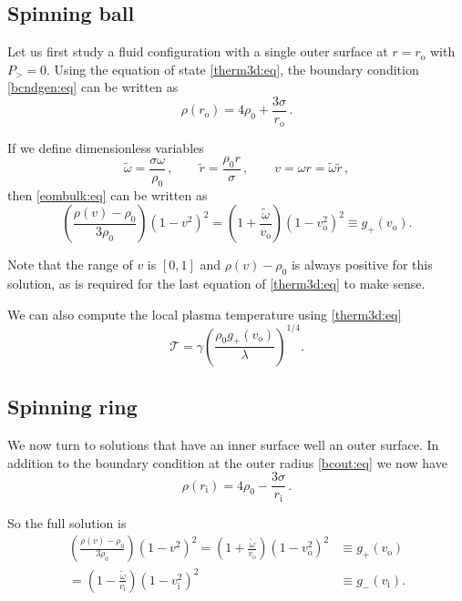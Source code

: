 \documentclass[12pt,a4paper]{article}
\newcommand{\prn}[1]{\left ( #1 \right )}
\newcommand{\rz}{\rho_0}
\newcommand{\tloc}{\mathcal{T}}
\newcommand{\ri}{r_\mathrm{i}}
\newcommand{\ro}{r_\mathrm{o}}
\newcommand{\vi}{v_\mathrm{i}}
\newcommand{\vo}{v_\mathrm{o}}
\newcommand{\z}{\tilde{r}}
\newcommand{\tw}{\widetilde{\omega}}
\begin{document}
\subsection{Spinning ball}\label{sec:ballsol}

Let us first study a fluid configuration with a single outer surface
at $r=\ro$ with $P_>=0$. Using the equation of state
\eqref{therm3d:eq}, the boundary condition \eqref{bcndgen:eq} can be
written as
%
\begin{equation}\label{bcout:eq}
  \rho(\ro) = 4\rz + \frac{3\sigma}{\ro}\,.
\end{equation}
%

If we define dimensionless variables
%
\begin{equation}\label{newvars:eq}
    \tw = \frac{\sigma\omega}{\rz} \,,   \qquad
    \z = \frac{\rz r}{\sigma} \,,   \qquad
    v = \omega r = \tw \z \,,
\end{equation}
%
then \eqref{eombulk:eq} can be written as
%
\begin{equation}\label{ballsol:eq}
  \prn{\frac{\rho(v)-\rz}{3\rz}}\prn{1-v^2}^{2}
       = \prn{1+\frac{\tw}{\vo}}\prn{1-\vo^2}^{2}
       \equiv g_+(\vo).
\end{equation}
%

Note that the range of $v$ is $[0,1]$ and $\rho(v)-\rz$ is always
positive for this solution, as is required for the last equation of
\eqref{therm3d:eq} to make sense.

We can also compute the local plasma temperature using
\eqref{therm3d:eq}
%
\begin{equation}\label{temploc:eq}
  \tloc = \gamma\prn{\frac{\rz g_+(\vo)}{\lambda}}^{1/4}.
\end{equation}
%

\subsection{Spinning ring}\label{sec:ringsol}

We now turn to solutions that have an inner surface well an outer
surface. In addition to the boundary condition at the outer radius
\eqref{bcout:eq} we now have
%
\begin{equation}\label{bcin:eq}
  \rho(\ri) = 4\rz - \frac{3\sigma}{\ri}\,.
\end{equation}
%


So the full solution is
%
\begin{equation}\label{ringsol:eq}
 \begin{split}
  \prn{\frac{\rho(v)-\rz}{3\rz}}\prn{1-v^2}^{2}
       = \prn{1+\frac{\tw}{\vo}}\prn{1-\vo^2}^{2}
       &\equiv g_+(\vo)\\
       = \prn{1-\frac{\tw}{\vi}}\prn{1-\vi^2}^{2}
       &\equiv g_-(\vi).
 \end{split}
\end{equation}
%
\end{document}
